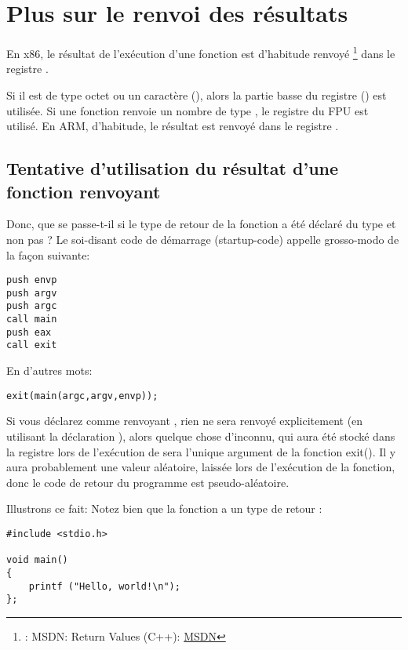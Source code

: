 ﻿\section{Plus sur le renvoi des résultats}


En x86, le résultat de l'exécution d'une fonction est d'habitude renvoyé
\footnote{\Seealso: MSDN: Return Values (C++): \href{http://go.yurichev.com/17258}{MSDN}}
dans le registre \EAX.

Si il est de type octet ou un caractère (\Tchar), alors la partie basse du registre
\EAX (\AL) est utilisée.
Si une fonction renvoie un nombre de type \Tfloat, le registre  du FPU est utilisé. %
En ARM, d'habitude, le résultat est renvoyé dans le registre .

\subsection{Tentative d'utilisation du résultat d'une fonction renvoyant \Tvoid}

Donc, que se passe-t-il si le type de retour de la fonction \main a été déclaré
du type \Tvoid et non pas \Tint?
Le soi-disant code de démarrage (startup-code) appelle \main grosso-modo de la façon
suivante:

\begin{lstlisting}[style=customasmx86]
push envp
push argv
push argc
call main
push eax
call exit
\end{lstlisting}

En d'autres mots:

\begin{lstlisting}[style=customc]
exit(main(argc,argv,envp));
\end{lstlisting}

Si vous déclarez \main comme renvoyant \Tvoid, rien ne sera renvoyé explicitement
(en utilisant la déclaration ), alors quelque chose d'inconnu, qui aura
été stocké dans la registre \EAX lors de l'exécution de \main sera l'unique argument
de la fonction exit().
Il y aura probablement une valeur aléatoire, laissée lors de l'exécution de la fonction,
donc le code de retour du programme est pseudo-aléatoire.
\par
Illustrons ce fait:
Notez bien  que la fonction \main a un type de retour \Tvoid:

\begin{lstlisting}[style=customc]
#include <stdio.h>

void main()
{
	printf ("Hello, world!\n");
};
\end{lstlisting}

